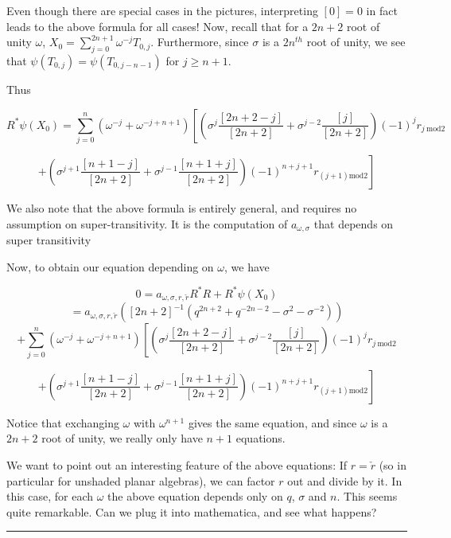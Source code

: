 \documentclass[12pt]{article}
\begin{document}
Even though there are special cases in the pictures, interpreting $[0]=0$ in fact leads to the above formula for all cases!  Now, recall that for a $2n+2$ root of unity $\omega$, $X_{0}=\sum^{2n+1}_{j=0} \omega^{-j}T_{0,j}$.  Furthermore, since $\sigma$ is a $2n^{th}$ root of unity, we see that $\psi(T_{0,j})=\psi(T_{0,j-n-1})$ for $j\ge n+1$.

Thus 

$$R^{*}\psi(X_0)=\sum^{n}_{j=0}(\omega^{-j}+\omega^{-j+n+1})\left[ \left(\sigma^{j}\frac{[2n+2-j]}{[2n+2]}
+\sigma^{j-2}\frac{[j]}{[2n+2]}\right)(-1)^{j} r_{j\ \text{mod}2}
\right.$$


$$\left.+\left( \sigma^{j+1}\frac{[n+1-j]}{[2n+2]}+\sigma^{j-1}\frac{[n+1+j]}{[2n+2]} \right)(-1)^{n+j+1}r_{(j+1)\text{mod}2}\right]$$


We also note that the above formula is entirely general, and requires no assumption on super-transitivity.  It is the computation of $a_{\omega, \sigma}$ that depends on super transitivity

Now, to obtain our equation depending on $\omega$, we have

$$0=a_{\omega, \sigma, r, \check{r}} R^{*}R+R^{*}\psi(X_0)$$
$$= a_{\omega, \sigma, r, \check{r}}([2n+2]^{-1}(q^{2n+2}+q^{-2n-2}-\sigma^{2}-\sigma^{-2}))$$
$$
+\sum^{n}_{j=0}(\omega^{-j}+\omega^{-j+n+1})\left[ \left(\sigma^{j}\frac{[2n+2-j]}{[2n+2]}
+\sigma^{j-2}\frac{[j]}{[2n+2]}\right)(-1)^{j} r_{j\ \text{mod}2}
\right.$$


$$\left.+\left( \sigma^{j+1}\frac{[n+1-j]}{[2n+2]}+\sigma^{j-1}\frac{[n+1+j]}{[2n+2]} \right)(-1)^{n+j+1}r_{(j+1)\text{mod}2}\right]$$

Notice that exchanging $\omega$ with $\omega^{n+1}$ gives the same equation, and since $\omega$ is a $2n+2$ root of unity, we really only have $n+1$ equations.

 We want to point out an interesting feature of the above equations:  If $r=\check{r}$ (so in particular for unshaded planar algebras), we can factor $r$ out and divide by it.  In this case, for each $\omega$ the above equation depends only on $q$, $\sigma$ and $n$.  This seems quite remarkable.  Can we plug it into mathematica, and see what happens?





\hrule

\bigskip
\end{document}
